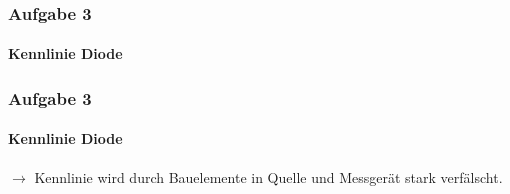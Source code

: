 \begin{frame}
\frametitle{Aufgabe 3}
\framesubtitle{Kennlinie Diode}
    \begin{figure}[H]
        \begin{center}
        \end{center}
    \end{figure}
\end{frame}
\begin{frame}
\frametitle{Aufgabe 3}
\framesubtitle{Kennlinie Diode}
    \begin{figure}[H]
        \begin{center}
        \end{center}
    \end{figure}
    $\rightarrow$ Kennlinie wird durch Bauelemente in Quelle und Messgerät
    stark verfälscht.
\end{frame}

